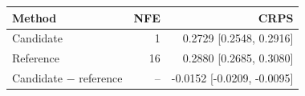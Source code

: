\begin{tabular}{lrr}
\toprule
Method & NFE & CRPS \\
\midrule
Candidate & 1 & 0.2729 [0.2548, 0.2916] \\
Reference & 16 & 0.2880 [0.2685, 0.3080] \\
\midrule
Candidate $-$ reference & -- & -0.0152 [-0.0209, -0.0095] \\
\bottomrule
\end{tabular}
